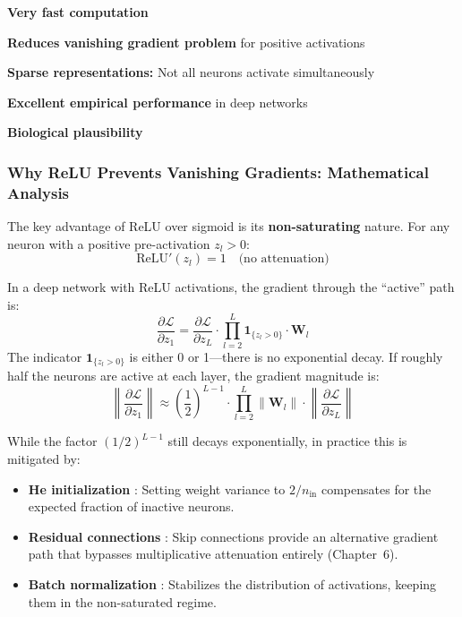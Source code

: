 \begin{advantages}
    \item \textbf{Very fast computation}
    \item \textbf{Reduces vanishing gradient problem} for positive activations
    \item \textbf{Sparse representations:} Not all neurons activate simultaneously
    \item \textbf{Excellent empirical performance} in deep networks
    \item \textbf{Biological plausibility}
\end{advantages}

\subsubsection{Why ReLU Prevents Vanishing Gradients: Mathematical Analysis}

The key advantage of ReLU over sigmoid is its \textbf{non-saturating} nature. For any neuron with a positive pre-activation $z_l > 0$:
\begin{equation}
\text{ReLU}'(z_l) = 1 \quad \text{(no attenuation)}
\end{equation}

In a deep network with ReLU activations, the gradient through the ``active'' path is:
\begin{equation}
\frac{\partial \mathcal{L}}{\partial z_1} = \frac{\partial \mathcal{L}}{\partial z_L} \cdot \prod_{l=2}^{L} \mathbf{1}_{\{z_l > 0\}} \cdot \mathbf{W}_l
\end{equation}
The indicator $\mathbf{1}_{\{z_l > 0\}}$ is either 0 or 1---there is no exponential decay. If roughly half the neurons are active at each layer, the gradient magnitude is:
\begin{equation}
\left\|\frac{\partial \mathcal{L}}{\partial z_1}\right\| \approx \left(\frac{1}{2}\right)^{L-1} \cdot \prod_{l=2}^{L} \|\mathbf{W}_l\| \cdot \left\|\frac{\partial \mathcal{L}}{\partial z_L}\right\|
\end{equation}

While the factor $(1/2)^{L-1}$ still decays exponentially, in practice this is mitigated by:
\begin{itemize}
    \item \textbf{He initialization} \cite{he2015delving}: Setting weight variance to $2/n_{\text{in}}$ compensates for the expected fraction of inactive neurons.
    \item \textbf{Residual connections} \cite{he2016deep}: Skip connections provide an alternative gradient path that bypasses multiplicative attenuation entirely (Chapter~6).
    \item \textbf{Batch normalization} \cite{ioffe2015batch}: Stabilizes the distribution of activations, keeping them in the non-saturated regime.
\end{itemize}

